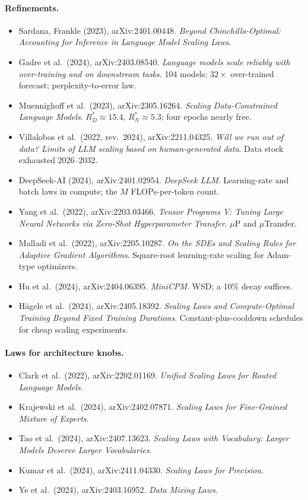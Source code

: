 \documentclass[11pt,letterpaper]{article}
\newcommand{\paper}[1]{\textit{#1}}
\begin{document}
\paragraph{Refinements.}
\begin{itemize}
\item Sardana, Frankle (2023), arXiv:2401.00448. \paper{Beyond Chinchilla-Optimal: Accounting for Inference in Language Model Scaling Laws}.
\item Gadre et al.\ (2024), arXiv:2403.08540. \paper{Language models scale reliably with over-training and on downstream tasks}. 104 models; $32\times$ over-trained forecast; perplexity-to-error law.
\item Muennighoff et al.\ (2023), arXiv:2305.16264. \paper{Scaling Data-Constrained Language Models}. $R_D^*\approx15.4$, $R_N^*\approx5.3$; four epochs nearly free.
\item Villalobos et al.\ (2022, rev.\ 2024), arXiv:2211.04325. \paper{Will we run out of data? Limits of LLM scaling based on human-generated data}. Data stock exhausted 2026--2032.
\item DeepSeek-AI (2024), arXiv:2401.02954. \paper{DeepSeek LLM}. Learning-rate and batch laws in compute; the $M$ FLOPs-per-token count.
\item Yang et al.\ (2022), arXiv:2203.03466. \paper{Tensor Programs V: Tuning Large Neural Networks via Zero-Shot Hyperparameter Transfer}. $\mu$P and $\mu$Transfer.
\item Malladi et al.\ (2022), arXiv:2205.10287. \paper{On the SDEs and Scaling Rules for Adaptive Gradient Algorithms}. Square-root learning-rate scaling for Adam-type optimizers.
\item Hu et al.\ (2024), arXiv:2404.06395. \paper{MiniCPM}. WSD; a 10\% decay suffices.
\item Hägele et al.\ (2024), arXiv:2405.18392. \paper{Scaling Laws and Compute-Optimal Training Beyond Fixed Training Durations}. Constant-plus-cooldown schedules for cheap scaling experiments.
\end{itemize}

\paragraph{Laws for architecture knobs.}
\begin{itemize}
\item Clark et al.\ (2022), arXiv:2202.01169. \paper{Unified Scaling Laws for Routed Language Models}.
\item Krajewski et al.\ (2024), arXiv:2402.07871. \paper{Scaling Laws for Fine-Grained Mixture of Experts}.
\item Tao et al.\ (2024), arXiv:2407.13623. \paper{Scaling Laws with Vocabulary: Larger Models Deserve Larger Vocabularies}.
\item Kumar et al.\ (2024), arXiv:2411.04330. \paper{Scaling Laws for Precision}.
\item Ye et al.\ (2024), arXiv:2403.16952. \paper{Data Mixing Laws}.
\end{itemize}
\end{document}
